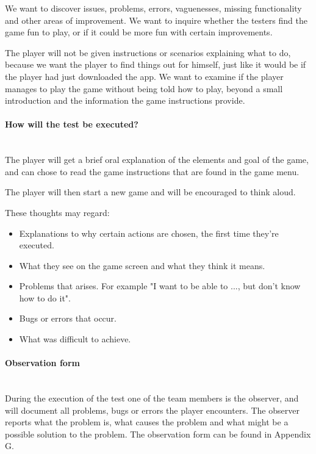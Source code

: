 		We want to discover issues, problems, errors, vaguenesses, missing functionality and other areas 
		of improvement. We want to inquire whether the testers find the game fun to play, or if it could 
		be more fun with certain improvements.

		The player will not be given instructions or scenarios explaining what to do, because we want 
		the player to find things out for himself, just like it would be if the player had just 
		downloaded the app. We want to examine if the player manages to play the game without being 
		told how to play, beyond a small introduction and the information the game instructions provide. 

	\paragraph{How will the test be executed?}\mbox{}\\

		The player will get a brief oral explanation of the elements and goal of the game, 
		and can chose to read the game instructions that are found in the game menu.

		The player will then start a new game and will be encouraged to think aloud. 

		These thoughts may regard:

		\begin{itemize}
		  \item Explanations to why certain actions are chosen, the first time they're executed.
		  \item What they see on the game screen and what they think it means.
		  \item Problems that arises. For example "I want to be able to ..., but don't know how to do it". 
		  \item Bugs or errors that occur.
		  \item What was difficult to achieve.
		\end{itemize}

	\paragraph{Observation form}\mbox{}\\

		During the execution of the test one of the team members is the observer, and will document all problems, bugs or errors the player encounters. The observer reports what the problem is, what causes the problem and what might be a possible solution to the problem. The observation form can be found in Appendix G.

